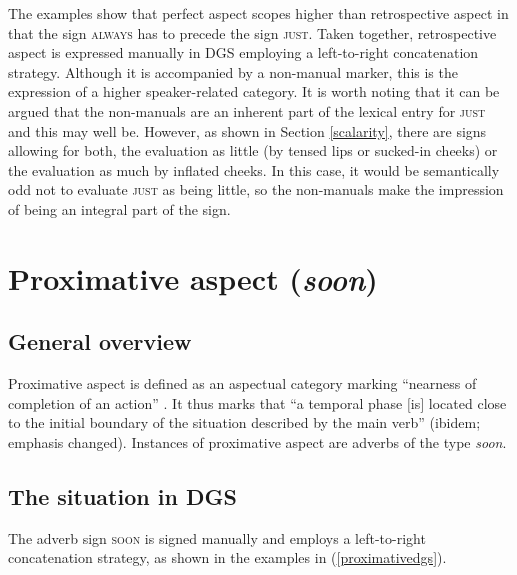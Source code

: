 \noindent The examples show that perfect aspect scopes higher than retrospective aspect in that the sign \textsc{always} has to precede the sign \textsc{just}. Taken together, retrospective aspect is expressed manually in DGS employing a left-to-right concatenation strategy. Although it is accompanied by a non-manual marker, this is the expression of a higher speaker-related category. It is worth noting that it can be argued that the non-manuals are an inherent part of the lexical entry for \textsc{just} and this may well be. However, as shown in Section \ref{scalarity}, there are signs allowing for both, the evaluation as little (by tensed lips or sucked-in cheeks) or the evaluation as much by inflated cheeks. In this case, it would be semantically odd not to evaluate \textsc{just} as being little, so the non-manuals make the impression of being an integral part of the sign. 


\section{Proximative aspect (\textit{soon})}
\subsection{General overview}
Proximative aspect is defined as an aspectual category marking ``nearness of completion of an action'' \citep[36]{heine1994genesis}. It thus marks that ``a temporal phase $[$is$]$ located close to the initial boundary of the situation described by the main verb'' (ibidem; emphasis changed). Instances of proximative aspect are adverbs of the type \textit{soon}. 

\subsection{The situation in DGS}
The adverb sign \textsc{soon} is signed manually and employs a left-to-right concatenation strategy, as shown in the examples in (\ref{proximativedgs}).

\begin{exe}
\ex \label{proximativedgs}\begin{xlist} 
\end{xlist}
\end{exe} 

